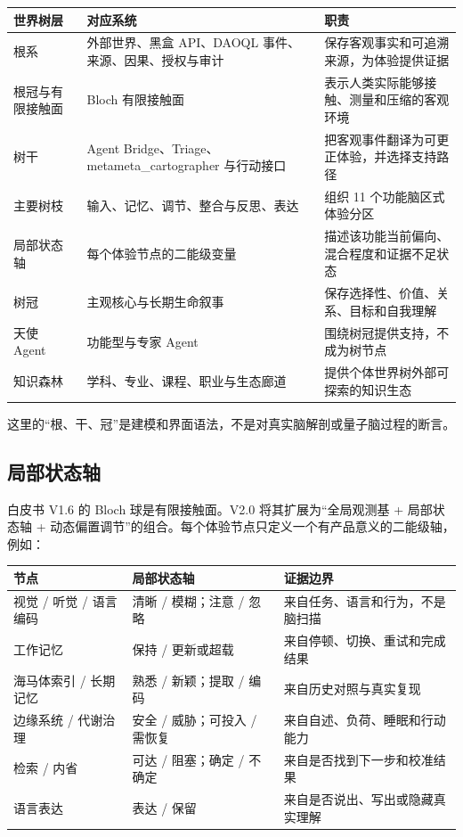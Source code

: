 \documentclass[UTF8,a4paper,11pt]{ctexart}
\begin{document}
\begin{center}
\begin{longtable}{@{}p{3.2cm}p{5.1cm}p{5.0cm}@{}}
\toprule
\textbf{世界树层} & \textbf{对应系统} & \textbf{职责} \\
\midrule
根系 & 外部世界、黑盒 API、DAOQL 事件、来源、因果、授权与审计 & 保存客观事实和可追溯来源，为体验提供证据 \\
根冠与有限接触面 & Bloch 有限接触面 & 表示人类实际能够接触、测量和压缩的客观环境 \\
树干 & Agent Bridge、Triage、metameta\_cartographer 与行动接口 & 把客观事件翻译为可更正体验，并选择支持路径 \\
主要树枝 & 输入、记忆、调节、整合与反思、表达 & 组织 11 个功能脑区式体验分区 \\
局部状态轴 & 每个体验节点的二能级变量 & 描述该功能当前偏向、混合程度和证据不足状态 \\
树冠 & 主观核心与长期生命叙事 & 保存选择性、价值、关系、目标和自我理解 \\
天使 Agent & 功能型与专家 Agent & 围绕树冠提供支持，不成为树节点 \\
知识森林 & 学科、专业、课程、职业与生态廊道 & 提供个体世界树外部可探索的知识生态 \\
\bottomrule
\end{longtable}
\end{center}

这里的“根、干、冠”是建模和界面语法，不是对真实脑解剖或量子脑过程的断言。

\subsection{局部状态轴}

白皮书 V1.6 的 Bloch 球是有限接触面。V2.0 将其扩展为“全局观测基 + 局部状态轴 + 动态偏置调节”的组合。每个体验节点只定义一个有产品意义的二能级轴，例如：

\begin{center}
\begin{longtable}{@{}p{4.3cm}p{4.0cm}p{5.0cm}@{}}
\toprule
\textbf{节点} & \textbf{局部状态轴} & \textbf{证据边界} \\
\midrule
视觉 / 听觉 / 语言编码 & 清晰 / 模糊；注意 / 忽略 & 来自任务、语言和行为，不是脑扫描 \\
工作记忆 & 保持 / 更新或超载 & 来自停顿、切换、重试和完成结果 \\
海马体索引 / 长期记忆 & 熟悉 / 新颖；提取 / 编码 & 来自历史对照与真实复现 \\
边缘系统 / 代谢治理 & 安全 / 威胁；可投入 / 需恢复 & 来自自述、负荷、睡眠和行动能力 \\
检索 / 内省 & 可达 / 阻塞；确定 / 不确定 & 来自是否找到下一步和校准结果 \\
语言表达 & 表达 / 保留 & 来自是否说出、写出或隐藏真实理解 \\
\bottomrule
\end{longtable}
\end{center}
\end{document}
